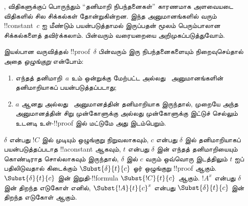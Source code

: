 \documentclass[../../../include/open-logic-section]{subfiles}
\begin{document}


\Elim{\lexists}, \Intro{\lforall} விதிகளுக்குப் பொருந்தும்
“தனிமாறி நிபந்தனைகள்” காரணமாக அளவையடை விதிகளில் சில
சிக்கல்கள் தோன்றுகின்றன. இந்த அனுமானங்களில் வரும்
!!{constant}~$c$ ஐ மீண்டும் பயன்படுத்தாமல் இருப்பதன் மூலம்
பெரும்பாலான சிக்கல்களைத் தவிர்க்கலாம். பின்வரும் வரையறையை
அறிமுகப்படுத்துவோம்.

\begin{defn}
இயல்பான வருவித்தல் !!{proof}~$\delta$ பின்வரும் இரு
நிபந்தனைகளையும் நிறைவுசெய்தால் அதை \emph{ஒழுங்குறு} என்போம்:
\begin{enumerate}
  \item எந்தத் தனிமாறி~$a$ உம் ஒன்றுக்கு மேற்பட்ட
  \Elim{\lexists} அல்லது~\Intro{\lforall} அனுமானங்களின்
  தனிமாறியாகப் பயன்படுத்தப்படாது;
  \item $a$ ஆனது \Elim{\lexists} அல்லது~\Intro{\lforall}
  அனுமானத்தின் தனிமாறியாக இருந்தால், முறையே அந்த அனுமானத்தின்
  சிறு முன்கோளுக்கு அல்லது முன்கோளுக்கு இட்டுச் செல்லும்
  உடனடி உள்-!!{proof} இல் மட்டுமே அது இடம்பெறும்.
\end{enumerate}
\end{defn}

\begin{lem}
$\delta$ என்பது $!C$ இல் முடியும் ஒழுங்குறு நிறுவலாகவும்,
$c$ என்பது $\delta$ இல் தனிமாறியாகப் பயன்படுத்தப்படாத
!!a{constant} ஆகவும், $t$ என்பது $\delta$ இன் எந்தத்
தனிமாறியையும் கொண்டிராத சொல்லாகவும் இருந்தால்,
$\delta$ இல் $c$ வரும் ஒவ்வொரு இடத்திலும் $t$ ஐப்
பதிலிடுவதால் கிடைக்கும் $\Subst{\delta}{t}{c}$ ஓர்
ஒழுங்குறு !!{proof} ஆகும். $\Subst{\delta}{t}{c}$ இன்
இறுதி-!!{formula} $\Subst{!C}{t}{c}$ ஆகும். $!A^x$
என்பது $\delta$ இன் திறந்த எடுகோள் எனில்,
$\Subst{!A}{t}{c}^x$ என்பது
$\Subst{\delta}{t}{c}$ இன் திறந்த எடுகோள் ஆகும்.
\end{lem}
\end{document}
